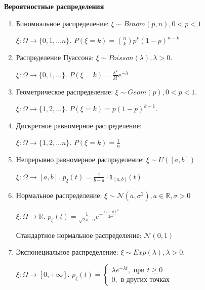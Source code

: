 \begin{example}
    \textbf{Вероятностные распределения}

    \begin{enumerate}
        \item {
            Биномиальное распределение: $\xi \sim Binom(p, n), 0 < p < 1$

            $\xi : \Omega \to \{ 0, 1, \ldots n \}$. $P(\xi = k) = \binom{n}{k} p^k (1 - p)^{n - k}$
        }
        \item {
            Распределение Пуассона: $\xi \sim Poisson(\lambda), \lambda > 0$.

            $\xi : \Omega \to \{ 0, 1, \ldots \}$. $P(\xi = k) = \frac{\lambda^k}{k!}e^{-\lambda}$
        }
        \item {
            Геометрическое распределение: $\xi \sim Geom(p), 0 < p < 1$.

            $\xi : \Omega \to \{ 1, 2, \ldots \}$. $P(\xi = k) = p(1 - p)^{k - 1}$.
        }
        \item {
            Дискретное равномерное распределение: %

            $\xi : \Omega \to \{ 1, 2, \ldots n \}$. $P(\xi = k) = \frac{1}{n}$
        }
        \item {
            Непрерывно равномерное распределение: $\xi \sim U([a, b])$

            $\xi : \Omega \to [a, b]$. $p_{\xi}(t) = \frac{1}{b - a} \cdot \mathds{1}_{[a, b]} (t)$
        }
        \item {
            Нормальное распределение: $\xi \sim \mathcal{N} (a, \sigma^2), a \in \mathbb{R}, \sigma > 0$

            $\xi : \Omega \to \mathbb{R}$. $p_{\xi}(t) = \frac{1}{\sqrt{2\pi} \cdot \sigma} e^{-\frac{(t - a)^2}{2\sigma^2}}$

            Стандартное нормальное распределение: $\mathcal{N} (0, 1)$
        }
        \item {
            Экспонециальное распределение: $\xi \sim Exp(\lambda), \lambda > 0$.

            $\xi : \Omega \to [0, +\infty]$. $p_{\xi}(t) = \begin{cases}
                \lambda e^{-\lambda t}, \text{ при } t \geqslant 0 \\
                0, \text{ в других точках}
            \end{cases}$
        }
    \end{enumerate}


\end{example}
